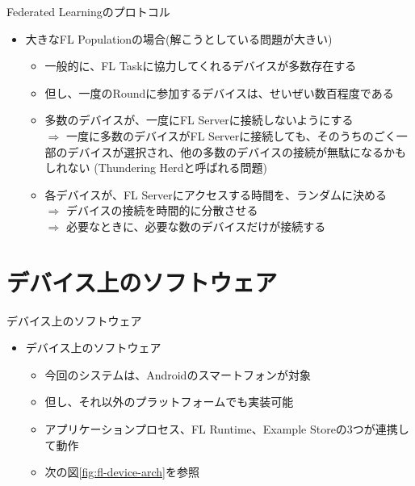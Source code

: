 \documentclass[dvipdfmx,notheorems,t]{beamer}
\begin{document}
\begin{frame}{Federated Learningのプロトコル}

\begin{itemize}
	\item 大きなFL Populationの場合(解こうとしている問題が大きい)
	\begin{itemize}
		\item 一般的に、FL Taskに協力してくれるデバイスが多数存在する
		\item 但し、一度のRoundに参加するデバイスは、せいぜい数百程度である
		\newline
		
		\item 多数のデバイスが、一度にFL Serverに接続しないようにする \\
		$\Rightarrow$ 一度に多数のデバイスがFL Serverに接続しても、そのうちのごく一部のデバイスが選択され、他の多数のデバイスの接続が無駄になるかもしれない (\alert{Thundering Herd}と呼ばれる問題)
		\newline
		
		\item 各デバイスが、FL Serverにアクセスする時間を、ランダムに決める \\
		$\Rightarrow$ デバイスの接続を時間的に分散させる \\
		$\Rightarrow$ 必要なときに、必要な数のデバイスだけが接続する
	\end{itemize}
\end{itemize}

\end{frame}

\section{デバイス上のソフトウェア}

\begin{frame}{デバイス上のソフトウェア}

\begin{itemize}
	\item デバイス上のソフトウェア
	\begin{itemize}
		\item 今回のシステムは、Androidのスマートフォンが対象
		\item 但し、それ以外のプラットフォームでも実装可能
		\newline
		
		\item アプリケーションプロセス、\alert{FL Runtime}、\alert{Example Store}の3つが連携して動作
		\item 次の図\ref{fig:fl-device-arch}を参照
	\end{itemize}
\end{itemize}

\end{frame}
\end{document}
